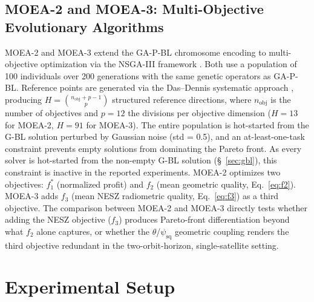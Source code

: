 \documentclass[preprint,12pt,authoryear]{elsarticle}
\begin{document}
\subsection{MOEA-2 and MOEA-3: Multi-Objective Evolutionary Algorithms}
\label{sec:moea-description}
MOEA-2 and MOEA-3 extend the GA-P-BL chromosome encoding to
multi-objective optimization via the NSGA-III framework
\citep{Deb2014}.
Both use a population of 100 individuals over 200 generations with
the same genetic operators as GA-P-BL.
Reference points are generated via the Das--Dennis systematic
approach \citep{DasDennis1998}, producing $H = \binom{n_{\text{obj}} + p - 1}{p}$ structured
reference directions, where $n_{\text{obj}}$ is the number of objectives
and $p = 12$ the divisions per objective dimension
($H = 13$ for MOEA-2, $H = 91$ for MOEA-3).
The entire population is hot-started from the G-BL solution perturbed
by Gaussian noise (std = 0.5), and an at-least-one-task constraint
prevents empty solutions from dominating the Pareto front. As every
solver is hot-started from the non-empty G-BL solution
(\S~\ref{sec:gbl}), this constraint is inactive in the reported
experiments.
MOEA-2 optimizes two objectives: $f_1^*$ (normalized profit) and
$f_2$ (mean geometric quality, Eq.~\ref{eq:f2}).
MOEA-3 adds $f_3$ (mean NESZ radiometric quality, Eq.~\ref{eq:f3})
as a third objective.
The comparison between MOEA-2 and MOEA-3 directly tests whether
adding the NESZ objective ($f_3$) produces Pareto-front differentiation
beyond what $f_2$ alone captures, or whether the $\theta$/$\psi_{\text{sq}}$
geometric coupling renders the third objective redundant in the
two-orbit-horizon, single-satellite setting.
\section{Experimental Setup}
\end{document}
